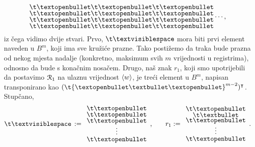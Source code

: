 \begin{equation}
\begin{array}{@{}c@{}}
    \t\textopenbullet\\
    \t\textopenbullet\\
    \t\textopenbullet\\
    \t\textopenbullet
    \end{array}
    \begin{array}{@{}c@{}}
    \t\textopenbullet\\
    \t\textopenbullet\\
    \t\textopenbullet\\
    \t\textopenbullet
    \end{array}
    \begin{array}{@{}c@{}}
    \t\textopenbullet\\
    \t\textopenbullet\\
    \t\textopenbullet\\
    \t\textopenbullet
    \end{array}\dotsm\text,
\end{equation}
iz čega vidimo dvije stvari. Prvo, $\bl$ mora biti prvi element naveden u $B^m$, koji ima sve kružiće prazne. Tako postižemo da traka bude prazna od nekog mjesta nadalje (konkretno, maksimum svih $m$ vrijednosti u registrima), odnosno da bude s konačnim nosačem. Drugo, naš znak $r_1$, koji smo upotrijebili da postavimo $\mathcal R_{1}$ na ulaznu vrijednost $\langle w\rangle$, je treći element u $B^m$, napisan transponirano kao $(\t{\textopenbullet\textbullet\textopenbullet}^{m-2})^\intercal$. Stupčano,
\begin{equation}
\renewcommand{\arraystretch}{0.1}
    \bl\,:=\begin{array}{c}
    \t\textopenbullet\\
    \t\textopenbullet\\
        \t\textopenbullet\\[0mm]
        \vdotswithin{\t\textopenbullet}\\[1mm]
    \t\textopenbullet
    \end{array}\text{,\qquad}
    r_1:=\begin{array}{c}
    \t\textopenbullet\\
    \t\textbullet\\
        \t\textopenbullet\\[0mm]
        \vdotswithin{\t\textopenbullet}\\[1mm]
    \t\textopenbullet
    \end{array}\text.
\end{equation}

